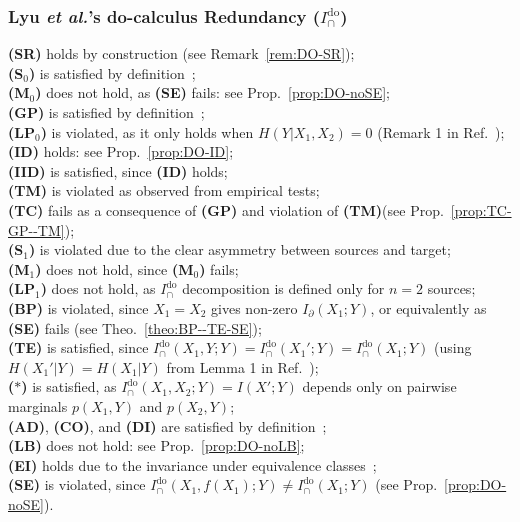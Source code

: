 \documentclass{article}
\makeatletter
\newcommand{\etalx}{\textit{et al.\@}\xspace}
\newcommand{\ts}[1]{\ensuremath{_{\text{#1}}}}
\newcommand{\SR}{\textbf{(SR)}\xspace} %
\newcommand{\Sz}{\textbf{(S\ts{0})}\xspace} %
\newcommand{\Mz}{\textbf{(M\ts{0})}\xspace} %
\newcommand{\GP}{\textbf{(GP)}\xspace} %
\newcommand{\LPz}{\textbf{(LP\ts{0})}\xspace} %
\newcommand{\ID}{\textbf{(ID)}\xspace} %
\newcommand{\IID}{\textbf{(IID)}\xspace} %
\newcommand{\TM}{\textbf{(TM)}\xspace} %
\newcommand{\TC}{\textbf{(TC)}\xspace} %
\newcommand{\So}{\textbf{(S\ts{1})}\xspace} %
\newcommand{\Mo}{\textbf{(M\ts{1})}\xspace} %
\newcommand{\LPo}{\textbf{(LP\ts{1})}\xspace} %
\newcommand{\BP}{\textbf{(BP)}\xspace} %
\newcommand{\TE}{\textbf{(TE)}\xspace} %
\newcommand{\AST}{\textbf{($\boldsymbol{\ast}$)}\xspace} %
\newcommand{\AD}{\textbf{(AD)}\xspace} %
\newcommand{\CO}{\textbf{(CO)}\xspace} %
\newcommand{\LB}{\textbf{(LB)}\xspace} %
\newcommand{\EI}{\textbf{(EI)}\xspace} %
\newcommand{\SE}{\textbf{(SE)}\xspace} %
\newcommand{\DI}{\textbf{(DI)}\xspace}
\newcommand{\Ido}{\ensuremath{I_\cap^{\text{do}}}\xspace}
\newcommand{\Idos}{\ensuremath{I_\cap^{\text{do}}(X_1,X_2;Y)}\xspace}
\makeatother
\begin{document}
\subsubsection*{Lyu \etalx's do-calculus Redundancy ($\Ido$)}
    \SR holds by construction (see Remark~\ref{rem:DO-SR}); \\
    \Sz is satisfied by definition~\cite{lyu2024explicit}; \\
    \Mz does not hold, as \SE fails: see Prop.~\ref{prop:DO-noSE}; \\
    \GP is satisfied by definition~\cite{lyu2024explicit}; \\
    \LPz is violated, as it only holds when $H(Y|X_1,X_2)=0$ (Remark 1 in Ref.~\cite{lyu2024explicit}); \\
    \ID holds: see Prop.~\ref{prop:DO-ID}; \\
    \IID is satisfied, since \ID holds; \\
    \TM is violated as observed from empirical tests; \\
    \TC fails as a consequence of \GP and violation of \TM (see Prop.~\ref{prop:TC-GP--TM}); \\
    \So is violated due to the clear asymmetry between sources and target; \\
    \Mo does not hold, since \Mz fails; \\
    \LPo does not hold, as \Ido decomposition is defined only for $n=2$ sources; \\
    \BP is violated, since $X_1=X_2$ gives non-zero $I_\partial(X_1;Y)$, or equivalently as \SE fails (see Theo.~\ref{theo:BP--TE-SE}); \\
    \TE is satisfied, since $\Ido(X_1,Y;Y)=\Ido(X_1';Y)=\Ido(X_1;Y)$ (using $H(X_1'|Y)=H(X_1|Y)$ from Lemma 1 in Ref.~\cite{lyu2024explicit}); \\
    \AST is satisfied, as $\Idos=I(X';Y)$ depends only on pairwise marginals $p(X_1,Y)$ and $p(X_2,Y)$; \\
    \AD, \CO, and \DI are satisfied by definition~\cite{lyu2024explicit}; \\
    \LB does not hold: see Prop.~\ref{prop:DO-noLB}; \\
    \EI holds due to the invariance under equivalence classes~\cite{li2011connection}; \\
    \SE is violated, since $\Ido(X_1,f(X_1);Y)\ne \Ido(X_1;Y)$ (see Prop.~\ref{prop:DO-noSE}).
    
\end{document}

